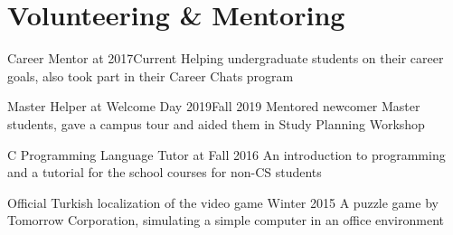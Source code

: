 
\section{Volunteering \& Mentoring}

\begin{denseouterlist}

\entrymid
{Career Mentor at }{2017\textendash Current} %
{Helping undergraduate students on their career goals, also took part in their Career Chats program}

\entrymid
{Master Helper at  Welcome Day 2019}{Fall 2019}
{Mentored newcomer Master students, gave a campus tour and aided them in Study Planning Workshop}

\entrymid
{C Programming Language Tutor at }{Fall 2016}
{An introduction to programming and a tutorial for the school courses for non-CS students}

\entrymid
{Official Turkish localization of the video game }{Winter 2015}
{A puzzle game by Tomorrow Corporation, simulating a simple computer in an office environment}

\end{denseouterlist}

